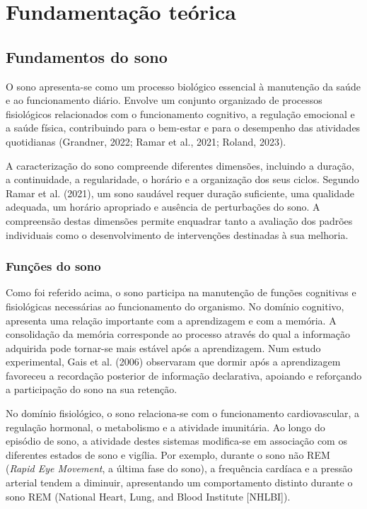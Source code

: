 % 
\chapter{Fundamentação teórica} %
\label{chap:Chapter2} %

%
\section{Fundamentos do sono} 
\label{sec:chap2_sleepFundaments} %

O sono apresenta-se como um processo biológico essencial à manutenção da saúde e ao funcionamento diário. Envolve um conjunto organizado de processos fisiológicos relacionados com o funcionamento cognitivo, a regulação emocional e a saúde física, contribuindo para o bem-estar e para o desempenho das atividades quotidianas (Grandner, 2022; Ramar et al., 2021; Roland, 2023).

A caracterização do sono compreende diferentes dimensões, incluindo a duração, a continuidade, a regularidade, o horário e a organização dos seus ciclos. Segundo Ramar et al. (2021), um sono saudável requer duração suficiente, uma qualidade adequada, um horário apropriado e ausência de perturbações do sono. A compreensão destas dimensões permite enquadrar tanto a avaliação dos padrões individuais como o desenvolvimento de intervenções destinadas à sua melhoria.

\subsection{Funções do sono}
\label{sec:chap2_sleepFunctions}

Como foi referido acima, o sono participa na manutenção de funções cognitivas e fisiológicas necessárias ao funcionamento do organismo. No domínio cognitivo, apresenta uma relação importante com a aprendizagem e com a memória. A consolidação da memória corresponde ao processo através do qual a informação adquirida pode tornar-se mais estável após a aprendizagem. Num estudo experimental, Gais et al. (2006) observaram que dormir após a aprendizagem favoreceu a recordação posterior de informação declarativa, apoiando e reforçando a participação do sono na sua retenção.

No domínio fisiológico, o sono relaciona-se com o funcionamento cardiovascular, a regulação hormonal, o metabolismo e a atividade imunitária. Ao longo do episódio de sono, a atividade destes sistemas modifica-se em associação com os diferentes estados de sono e vigília. Por exemplo, durante o sono não REM (\textit{Rapid Eye Movement}, a última fase do sono), a frequência cardíaca e a pressão arterial tendem a diminuir, apresentando um comportamento distinto durante o sono REM (National Heart, Lung, and Blood Institute [NHLBI]).


